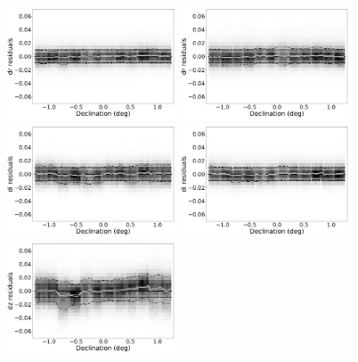 \documentclass[fleqn,usenatbib]{mnras}
\begin{document}
\begin{figure}
    \centering\includegraphics[width=0.45\textwidth]{figures/colorResidDES42bright_dr_Dec_Hess.png}
    \centering\includegraphics[width=0.45\textwidth]{figures/colorResidPSDR2v42bright_dr_Dec_Hess.png}
    \centering\includegraphics[width=0.45\textwidth]{figures/colorResidDES42bright_di_Dec_Hess.png}
    \centering\includegraphics[width=0.45\textwidth]{figures/colorResidPSDR2v42bright_di_Dec_Hess.png}
    \centering\includegraphics[width=0.45\textwidth]{figures/colorResidDES42bright_dz_Dec_Hess.png}

\end{figure}
\end{document}
